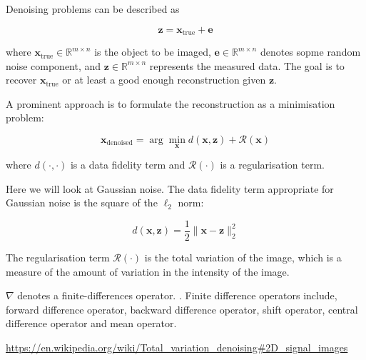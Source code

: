 \documentclass[12pt]{article}
\begin{document}

Denoising problems can be described as 

\begin{equation}
  \mathbf{z} = \mathbf{x}_{\text{true}} + \mathbf{e}
\end{equation}
  
where $\mathbf{x}_{\text{true}} \in \mathbb{R}^{m \times n}$ is 
the object to be imaged, 
$\mathbf{e} \in \mathbb{R}^{m \times n}$ denotes sopme random noise component, and $\mathbf{z} \in \mathbb{R}^{m \times n}$ represents 
the measured data.
The goal is to recover $\mathbf{x}_{\text{true}}$ or at least a good enough reconstruction given $\mathbf{z}$.

A prominent approach is to formulate the reconstruction as a minimisation problem:


\begin{equation}
  \mathbf{x}_{\text{denoised}} = \arg \min_{\mathbf{x}} d(\mathbf{x}, \mathbf{z}) + \mathcal{R}(\mathbf{x})
\end{equation}

where $d(\cdot, \cdot)$ is a data fidelity term and $\mathcal{R}(\cdot)$ is a regularisation term.


Here we will look at Gaussian noise. The data fidelity term appropriate for Gaussian noise is the square of the $\ell_2$ norm:

\begin{equation}
  d(\mathbf{x}, \mathbf{z}) = \frac{1}{2} \|\mathbf{x} - \mathbf{z}\|_2^2
\end{equation}

The regularisation term $\mathcal{R}(\cdot)$ is the total variation of the image, which is a measure of the amount of variation in the intensity of the image.


$\nabla$ denotes a finite-differences operator.
\cite{finite_difference_op}.
Finite difference operators include, forward difference operator,
backward difference operator, shift operator, central difference operator and mean operator.

\url{https://en.wikipedia.org/wiki/Total_variation_denoising#2D_signal_images}
\end{document}
